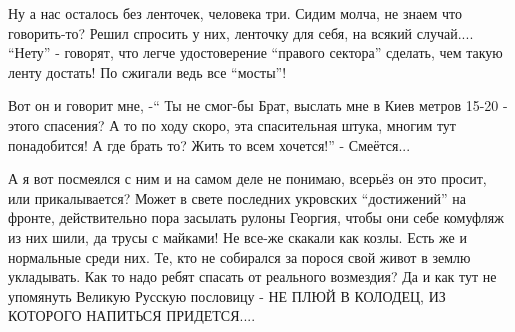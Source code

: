 Ну а нас осталось без ленточек, человека три. Сидим молча, не знаем что
говорить-то? Решил спросить у них, ленточку для себя, на всякий случай....
\enquote{Нету} - говорят, что легче удостоверение \enquote{правого сектора} сделать, чем такую
ленту достать! По сжигали ведь все \enquote{мосты}! 

Вот он и говорит мне, -\enquote{ Ты не смог-бы Брат, выслать мне в Киев метров 15-20 -
этого спасения? А то по ходу скоро, эта спасительная штука, многим тут
понадобится! А где брать то? Жить то всем хочется!} - Смеётся...

А я вот посмеялся с ним и на самом деле не понимаю, всерьёз он это просит, или
прикалывается? Может в свете последних укровских \enquote{достижений} на фронте,
действительно пора засылать рулоны Георгия, чтобы они себе комуфляж из них
шили, да трусы с майками! Не все-же скакали как козлы. Есть же и нормальные
среди них. Те, кто не собирался за порося свой живот в землю укладывать. Как
то надо ребят спасать от реального возмездия? Да и как тут не упомянуть Великую
Русскую пословицу - НЕ ПЛЮЙ В КОЛОДЕЦ, ИЗ КОТОРОГО НАПИТЬСЯ ПРИДЕТСЯ....
